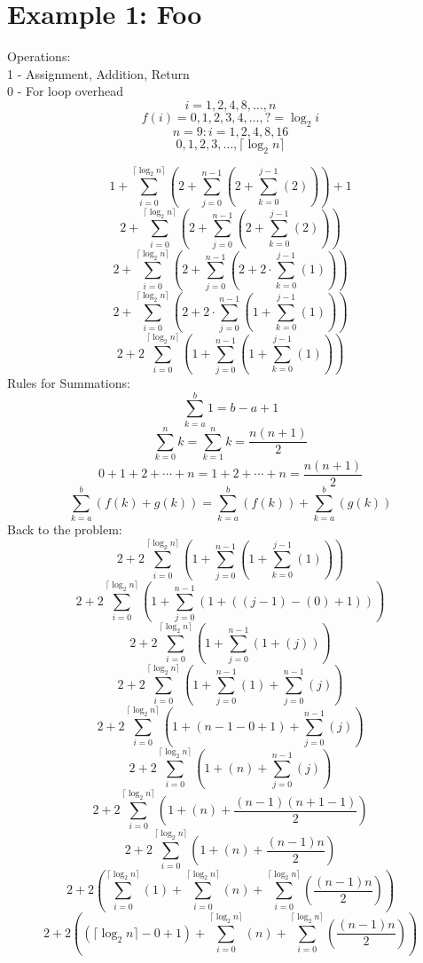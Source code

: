 \documentclass{article}
\begin{document}
\tableofcontents

\section{Example 1: Foo}
Operations:\\
1 - Assignment, Addition, Return\\
0 - For loop overhead\\
$$i=1,2,4,8,\ldots,n$$
$$f(i)=0,1,2,3,4,\ldots,?=\log_2i$$
$$n=9:i=1,2,4,8,16$$
$$0,1,2,3,\ldots,\lceil\log_2n\rceil$$

$$1+\sum_{i=0}^{\lceil\log_2n\rceil}\left(2+\sum_{j=0}^{n-1}\left(2+\sum_{k=0}^{j-1}\left(2\right)\right)\right)+1$$
$$2+\sum_{i=0}^{\lceil\log_2n\rceil}\left(2+\sum_{j=0}^{n-1}\left(2+\sum_{k=0}^{j-1}\left(2\right)\right)\right)$$
$$2+\sum_{i=0}^{\lceil\log_2n\rceil}\left(2+\sum_{j=0}^{n-1}\left(2+2\cdot\sum_{k=0}^{j-1}\left(1\right)\right)\right)$$
$$2+\sum_{i=0}^{\lceil\log_2n\rceil}\left(2+2\cdot\sum_{j=0}^{n-1}\left(1+\sum_{k=0}^{j-1}\left(1\right)\right)\right)$$
$$2+2\sum_{i=0}^{\lceil\log_2n\rceil}\left(1+\sum_{j=0}^{n-1}\left(1+\sum_{k=0}^{j-1}\left(1\right)\right)\right)$$
Rules for Summations:
$$\sum_{k=a}^{b}1=b-a+1$$
$$\sum_{k=0}^{n}k=\sum_{k=1}^{n}k=\frac{n\left(n+1\right)}{2}$$
$$0+1+2+\cdots+n=1+2+\cdots+n=\frac{n\left(n+1\right)}{2}$$
$$\sum_{k=a}^{b}\left(f(k)+g(k)\right)=\sum_{k=a}^{b}\left(f(k)\right)+\sum_{k=a}^{b}\left(g(k)\right)$$
Back to the problem:
$$2+2\sum_{i=0}^{\lceil\log_2n\rceil}\left(1+\sum_{j=0}^{n-1}\left(1+\sum_{k=0}^{j-1}\left(1\right)\right)\right)$$
$$2+2\sum_{i=0}^{\lceil\log_2n\rceil}\left(1+\sum_{j=0}^{n-1}\left(1+\left(\left(j-1\right)-\left(0\right)+1\right)\right)\right)$$
$$2+2\sum_{i=0}^{\lceil\log_2n\rceil}\left(1+\sum_{j=0}^{n-1}\left(1+\left(j\right)\right)\right)$$
$$2+2\sum_{i=0}^{\lceil\log_2n\rceil}\left(1+\sum_{j=0}^{n-1}\left(1\right)+\sum_{j=0}^{n-1}\left(j\right)\right)$$
$$2+2\sum_{i=0}^{\lceil\log_2n\rceil}\left(1+\left(n-1-0+1\right)+\sum_{j=0}^{n-1}\left(j\right)\right)$$
$$2+2\sum_{i=0}^{\lceil\log_2n\rceil}\left(1+\left(n\right)+\sum_{j=0}^{n-1}\left(j\right)\right)$$
$$2+2\sum_{i=0}^{\lceil\log_2n\rceil}\left(1+\left(n\right)+\frac{\left(n-1\right)\left(n+1-1\right)}{2}\right)$$
$$2+2\sum_{i=0}^{\lceil\log_2n\rceil}\left(1+\left(n\right)+\frac{\left(n-1\right)n}{2}\right)$$
$$2+2\left(\sum_{i=0}^{\lceil\log_2n\rceil}\left(1\right)+\sum_{i=0}^{\lceil\log_2n\rceil}\left(n\right)+\sum_{i=0}^{\lceil\log_2n\rceil}\left(\frac{\left(n-1\right)n}{2}\right)\right)$$
$$2+2\left(\left(\lceil\log_2n\rceil-0+1\right)+\sum_{i=0}^{\lceil\log_2n\rceil}\left(n\right)+\sum_{i=0}^{\lceil\log_2n\rceil}\left(\frac{\left(n-1\right)n}{2}\right)\right)$$
\end{document}

